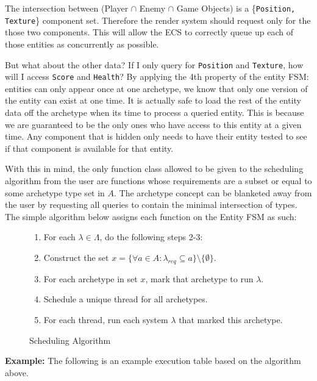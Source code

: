 The intersection between (Player $\cap$ Enemy $\cap$ Game Objects) is a \{\texttt{Position, Texture}\} component set. Therefore the render system should request only for the those two components. This will allow the ECS to correctly queue up each of those entities as concurrently as possible. 

But what about the other data? If I only query for \texttt{Position} and \texttt{Texture}, how will I access \texttt{Score} and \texttt{Health}? By applying the 4th property of the entity FSM: entities can only appear once at one archetype, we know that only one version of the entity can exist at one time. It is actually safe to load the rest of the entity data off the archetype when its time to process a queried entity. This is because we are guaranteed to be the only ones who have access to this entity at a given time. Any component that is hidden only needs to have their entity tested to see if that component is available for that entity.

With this in mind, the only function class allowed to be given to the scheduling algorithm from the user are functions whose requirements are a subset or equal to some archetype type set in $A$. The archetype concept can be blanketed away from the user by requesting all queries to contain the minimal intersection of types. The simple algorithm below assigns each function on the Entity FSM as such:

\begin{figure}[H]
    \begin{enumerate}
        \item For each $\lambda \in \Lambda$, do the following steps 2-3:
        \item Construct the set $x = \{\forall a \in A : \lambda_{req} \subseteq a \} \setminus \{\emptyset\}$.
        \item For each archetype in set $x$, mark that archetype to run $\lambda$.
        \item Schedule a unique thread for all archetypes.
        \item For each thread, run each system $\lambda$ that marked this archetype.
    \end{enumerate}
    \caption{Scheduling Algorithm}
\end{figure}

\textbf{Example:} The following is an example execution table based on the algorithm above.

